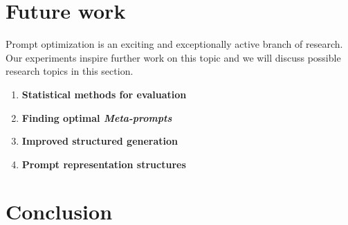 \section{Future work}
Prompt optimization is an exciting and exceptionally active branch of research. 
Our experiments inspire further work on this topic and we will discuss possible research topics in this section.
\begin{enumerate}
    \item \textbf{Statistical methods for evaluation}
    \item \textbf{Finding optimal \textit{Meta-prompts}}
    \item \textbf{Improved structured generation}
    \item \textbf{Prompt representation structures}
\end{enumerate}
\section{Conclusion}
